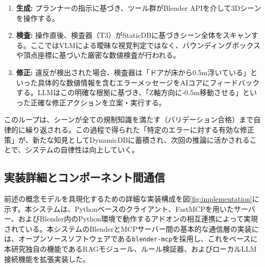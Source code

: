 \documentclass[dvipdfmx, a4paper, 9pt]{deimj}
\begin{document}
\begin{enumerate}
  \item \textbf{生成:} プランナーの指示に基づき、ツール群がBlender APIを介して3Dシーンを操作する。
  \item \textbf{検査:} 操作直後、検査器（T3）がStaticDBに基づきシーン全体をスキャンする。ここではVLMによる曖昧な視覚判定ではなく、バウンディングボックスや頂点座標に基づいた厳密な数値検査が行われる。
  \item \textbf{修正:} 違反が検出された場合、検査器は「ドアが床から0.5m浮いている」といった具体的な数値情報を含むエラーメッセージをAIコアにフィードバックする。LLMはこの明確な根拠に基づき、「Z軸方向に-0.5m移動させる」といった正確な修正アクションを立案・実行する。
\end{enumerate}

このループは、シーンが全ての規制知識を満たす（バリデーション合格）まで自律的に繰り返される。この過程で得られた「特定のエラーに対する有効な修正策」が、新たな知見としてDynamicDBに蓄積され、次回の推論に活かされることで、システムの自律性は向上していく。

\subsection{実装詳細とコンポーネント間通信}

前述の概念モデルを具現化するための詳細な実装構成を図\ref{fig:implementation}に示す。本システムは、Pythonベースのクライアント、FastMCPを用いたサーバー、およびBlender内のPython環境で動作するアドオンの相互連携によって実現されている。本システムのBlenderとMCPサーバー間の基本的な通信層の実装には、オープンソースソフトウェアである\texttt{blender-mcp}\cite{ahuja2025blendermcp}を採用し、これをベースに本研究独自の機能であるRAGモジュール、ルール検証器、およびローカルLLM接続機能を拡張実装した。
\end{document}
